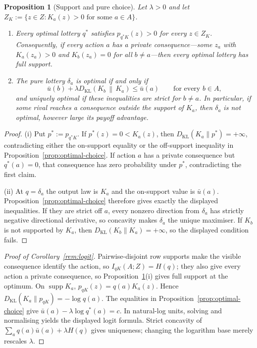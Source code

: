 \documentclass[11pt,a4paper]{article}
\newtheorem{proposition}[theorem]{Proposition}
\theoremstyle{definition}
\newcommand{\I}{I}
\newcommand{\Sh}{H}
\newcommand{\supp}{\operatorname{supp}}
\newcommand{\KL}{D_{\mathrm{KL}}}
\newcommand{\1}{\mathbf 1}
\begin{document}
\begin{proposition}[Support and pure choice]\label{cor:support-pure}
Let $\lambda>0$ and let
$Z_K:=\{z\in Z:K_a(z)>0\text{ for some }a\in A\}$.
\begin{enumerate}[label=\textup{(\roman*)},leftmargin=*]
\item Every optimal lottery $q^*$ satisfies $p_{q^*K}(z)>0$ for every
$z\in Z_K$.  Consequently, if every action $a$ has a private
consequence---some $z_a$ with $K_a(z_a)>0$ and $K_b(z_a)=0$ for all
$b\ne a$---then every optimal lottery has full support.
\item The pure lottery $\delta_a$ is optimal if and only if
\[
 \bar u(b)+\lambda\KL\!\left(K_b\,\middle\|\,K_a\right)
 \le \bar u(a)
 \qquad\text{for every }b\in A,
\]
and uniquely optimal if these inequalities are strict for $b\ne a$.  In
particular, if some rival reaches a consequence outside the support of
$K_a$, then $\delta_a$ is not optimal, however large its payoff advantage.
\end{enumerate}
\end{proposition}

\begin{proof}
(i) Put $p^*:=p_{q^*K}$.  If $p^*(z)=0<K_a(z)$, then
$\KL(K_a\|p^*)=+\infty$, contradicting either the on-support equality or
the off-support inequality in Proposition~\ref{prop:optimal-choice}.
If action $a$ has a private consequence but $q^*(a)=0$, that consequence
has zero probability under $p^*$, contradicting the first claim.

(ii) At $q=\delta_a$ the output law is $K_a$ and the on-support value is
$\bar u(a)$.  Proposition~\ref{prop:optimal-choice} therefore gives exactly
the displayed inequalities.  If they are strict off $a$, every nonzero
direction from $\delta_a$ has strictly negative directional derivative, so
concavity makes $\delta_a$ the unique maximiser.
If $K_b$ is not supported by $K_a$, then $\KL(K_b\|K_a)=+\infty$, so the
displayed condition fails.
\end{proof}

\begin{proof}[Proof of Corollary~\ref{rem:logit}]
Pairwise-disjoint row supports make the visible consequence identify the
action, so $\I_{qK}(A;Z)=\Sh(q)$; they also give every action a private
consequence, so Proposition~\ref{cor:support-pure}\textup{(i)} gives full
support at the optimum.  On $\supp K_a$,
$p_{qK}(z)=q(a)K_a(z)$.  Hence
$\KL(K_a\|p_{qK})=-\log q(a)$.  The equalities in
Proposition~\ref{prop:optimal-choice} give
$\bar u(a)-\lambda\log q^*(a)=c$.  In natural-log units, solving and
normalising yields the displayed logit formula.  Strict concavity of
$\sum_aq(a)\bar u(a)+\lambda\Sh(q)$ gives uniqueness; changing the
logarithm base merely rescales $\lambda$.
\end{proof}
\end{document}
